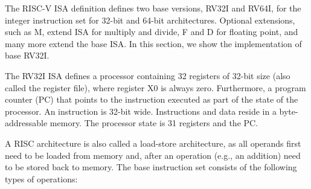 \documentclass[%
    10pt,
    headinclude, footexclude,
    openright, %
    notitlepage,
    cleardoubleempty,
    headsepline,
    pointlessnumbers,
    bibtotoc, idxtotoc,
    ]{scrbook}
\begin{document}
The RISC-V ISA definition defines two base versions, RV32I and RV64I, for the integer
instruction set for 32-bit and 64-bit architectures. Optional extensions, such as M,
extend ISA for multiply and divide, F and D for floating point, and many more extend the base ISA.
In this section, we show the implementation of base RV32I.

The RV32I ISA defines a processor containing 32 registers of 32-bit size (also called
the register file), where register X0 is always zero. Furthermore, a program counter (PC)
that points to the instruction executed as part of the state of the processor.
An instruction is 32-bit wide.
Instructions and data reside in a byte-addressable memory.
The processor state is 31 registers and the PC.

A RISC architecture is also called a load-store architecture, as all operands first need to
be loaded from memory and, after an operation (e.g., an addition) need to be stored
back to memory. The base instruction set consists of the following types of operations:
\end{document}
